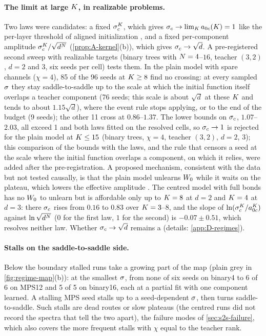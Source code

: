 \paragraph{The limit at large $K$, in realizable problems.}
\empirical{} \newresult{} Two laws were candidates: a fixed $\sigma_c^K$, which gives $\sigma_c\to\lim_K a_{0c}(K)=1$
like the per-layer threshold of aligned initialization , and a fixed
per-component amplitude $\sigma_c^K/\sqrt{d^N}$ (\cref{prop:A-kernel}(b)), which gives $\sigma_c\to\sqrt d$. A
pre-registered second sweep with realizable targets (binary trees with $N=4$--$16$, teacher $(3,2)$, $d=2$ and $3$,
six seeds per cell) tests them. In the plain model with spare channels ($\chi=4$), 85 of the 96 seeds at $K\ge8$
find no crossing: at every sampled $\sigma$ they stay saddle-to-saddle up to the scale at which the initial function
itself overlaps a teacher component (76 seeds; this scale is about $\sqrt d$ at these $K$ and tends to about
$1.15\sqrt d$), where the event rule stops applying, or to the end of the budget (9 seeds); the other 11 cross at
$0.86$--$1.37$. The lower bounds on $\sigma_c$, $1.07$--$2.03$, all exceed 1 and both laws fitted on the resolved cells,
so $\sigma_c\to1$ is rejected for the plain model at $K\le15$ (binary trees, $\chi=4$, teacher $(3,2)$, $d=2$, $3$);
this comparison of the bounds with the laws, and the rule that censors a seed at the scale where the initial
function overlaps a component, on which it relies, were added after the pre-registration. A proposed mechanism, consistent with the data but not tested
causally, is that the plain model unlearns
$W_{0}$ while it waits on the plateau, which lowers the effective amplitude \conjecture. The centred model with full
bonds has no $W_{0}$ to unlearn but is affordable only up to $K=8$ at $d=2$ and $K=4$ at $d=3$: there $\sigma_c$ rises
from $0.16$ to $0.83$ over $K=3$--$8$, and the slope of $\ln(\sigma_c^K/a_{0c}^K)$ against $\ln\sqrt{d^N}$ ($0$ for
the first law, $1$ for the second) is $-0.07\pm0.51$, which resolves neither law. Whether $\sigma_c\to\sqrt d$ remains a
\conjecture{} (details: \cref{app:D-regimes}).

\paragraph{Stalls on the saddle-to-saddle side.}
\empirical{} Below the boundary stalled runs take a growing part of the map (plain grey in
\cref{fig:regime-map}(b)): at the smallest $\sigma$, from none of six seeds on binary4 to 6 of 6 on MPS12 and 5 of 5
on binary16, each at a partial fit with one component learned. A stalling MPS seed stalls up to a seed-dependent
$\sigma$, then turns saddle-to-saddle. Such stalls are dead routes or slow plateaus (the centred runs did not
record the spectra that tell the two apart), the failure modes of \cref{sec:s2s-failure}, which also covers
the more frequent stalls with $\chi$ equal to the teacher rank.

